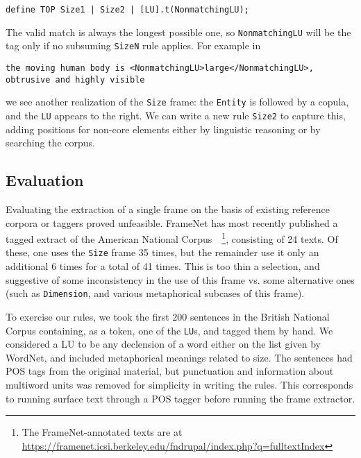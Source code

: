 \documentclass{llncs}
\begin{document}
\begin{center}
  \small
  \begin{framed}
\begin{verbatim}
define TOP Size1 | Size2 | [LU].t(NonmatchingLU);
\end{verbatim}
  \end{framed}
\end{center}
\normalsize

The valid match is always the longest possible one, so \verb+NonmatchingLU+ will be the tag only if no subsuming \verb+SizeN+ rule applies.
For example in

\begin{center}
\small
\begin{framed}
\begin{verbatim}
the moving human body is <NonmatchingLU>large</NonmatchingLU>,
obtrusive and highly visible
\end{verbatim}
\end{framed}
\end{center}
\normalsize

\noindent we see another realization of the \verb+Size+ frame: the \verb+Entity+ is followed by a
copula, and the \verb+LU+ appears to the right. We can write a new rule
\verb+Size2+ to capture this, adding positions for non-core elements either by
linguistic reasoning or by searching the corpus.

\subsection{Evaluation}

Evaluating the extraction of a single frame on the basis of existing reference
corpora or taggers proved unfeasible. FrameNet has most recently published a
tagged extract of the American National
Corpus~\cite{anc}~\footnote{The FrameNet-annotated texts are at\\\url{https://framenet.icsi.berkeley.edu/fndrupal/index.php?q=fulltextIndex}},
consisting of 24 texts. Of these, one uses the \verb+Size+ frame 35 times, but the remainder use it only an additional 6 times
for a total of 41 times. This is too thin a selection, and suggestive of some inconsistency in the use of this frame vs.\@
some alternative ones (such as \verb+Dimension+, and various metaphorical subcases of this frame).

To exercise our rules, we took the first 200 sentences in the British National
Corpus containing, as a token, one of the \verb+LU+s, and tagged them by hand.
We considered a LU to be any declension of a word either on the list given by WordNet,
and included metaphorical meanings related to size.
The sentences had POS tags from the original material, but punctuation
and information about multiword units was removed for simplicity in writing
the rules. This corresponds to running surface text through a POS tagger before
running the frame extractor.
\end{document}
